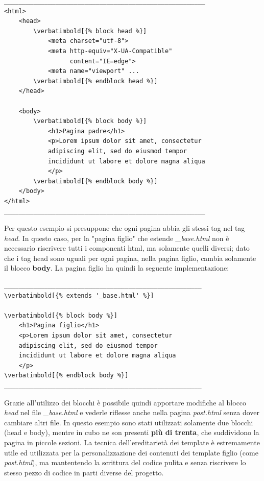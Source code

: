 \documentclass[12pt,a4paper]{article}
\newcommand\verbatimbold[1]{\textbf{#1}}
\begin{document}
\begin{Verbatim}[commandchars=\\\[\]]
_______________________________________________________
<html>
    <head>
        \verbatimbold[{% block head %}]
            <meta charset="utf-8">
            <meta http-equiv="X-UA-Compatible"
                  content="IE=edge">
            <meta name="viewport" ...
        \verbatimbold[{% endblock head %}]
    </head>

    <body>
        \verbatimbold[{% block body %}]
            <h1>Pagina padre</h1>
            <p>Lorem ipsum dolor sit amet, consectetur
            adipiscing elit, sed do eiusmod tempor
            incididunt ut labore et dolore magna aliqua
            </p>
        \verbatimbold[{% endblock body %}]
    </body>
</html>
_______________________________________________________
\end{Verbatim}
Per questo esempio si presuppone che ogni pagina abbia gli stessi tag nel tag \textit{head}.
In questo caso, per la "pagina figlio" che estende \textit{\_base.html} non è necessario riscrivere tutti i componenti html, ma solamente quelli diversi; dato che i tag head sono uguali per ogni pagina, nella pagina figlio, cambia solamente il blocco \textbf{body}. La pagina figlio ha quindi la seguente implementazione:

\begin{Verbatim}[commandchars=\\\[\]]
______________________________________________________
\verbatimbold[{% extends '_base.html' %}]

\verbatimbold[{% block body %}]
    <h1>Pagina figlio</h1>
    <p>Lorem ipsum dolor sit amet, consectetur
    adipiscing elit, sed do eiusmod tempor
    incididunt ut labore et dolore magna aliqua
    </p>
\verbatimbold[{% endblock body %}]
______________________________________________________
\end{Verbatim}
Grazie all'utilizzo dei blocchi è possibile quindi apportare modifiche al blocco \textit{head} nel file \textit{\_base.html} e vederle riflesse anche nella pagina \textit{post.html} senza dover cambiare altri file.
In questo esempio sono stati utilizzati solamente due blocchi (head e body), mentre in cubo ne son presenti \textbf{più di trenta}, che suddividono la pagina in piccole sezioni. La tecnica dell'ereditarietà dei template è estremamente utile ed utilizzata per la personalizzazione dei contenuti dei template figlio (come \textit{post.html}), ma mantentendo la scrittura del codice pulita e senza riscrivere lo stesso pezzo di codice in parti diverse del progetto.
\end{document}
